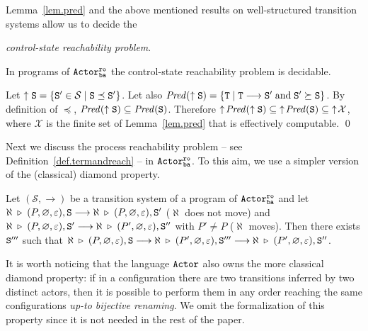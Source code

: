 \documentclass{LMCS}
\newcommand{\cal}{\mathcal}
\theoremstyle{plain}\newtheorem{proposition}[thm]{Proposition}
\theoremstyle{plain}\newtheorem{lemma}[thm]{Lemma}
\theoremstyle{plain}\newtheorem{theorem}[thm]{Theorem}
\theoremstyle{plain}\newtheorem{corollary}[thm]{Corollary}
\newif\ifconf \conffalse
\newif\ifcamera \camerafalse
\newcommand{\State}{{\tt S}}
\newcommand{\StateT}{{\tt T}}
\newcommand{\lred}[1]{\stackrel{#1}{\longrightarrow}}
\newcommand{\pred}[1]{{\it Pred}(#1)}
\newcommand{\actor}{${\tt Actor}$}
\newcommand{\actroba}{${\tt Actor^{\tt ro}_{\tt ba}}$}
\begin{document}
Lemma~\ref{lem.pred} and the above mentioned results
on well-structured transition systems
allow us to decide the 
\ifcamera
 \emph{control-state
reachability problem}:
given two states ${\State}$ and ${\StateT}$ of a well-structured transition system with well-quasi-ordering
$\preceq$, decide
whether there is $\StateT' \succeq \StateT$ such that $\State \lred{}^* \StateT'$.
\else
 \emph{control-state
reachability problem}.
\fi

\begin{thm}
\label{thm.cs-reachability}
\ifcamera
In {\actroba} process reachability is decidable.
\else
In programs of {\actroba}
the control-state reachability problem is decidable.
\fi
\end{thm}

\ifconf
\else
\proof
Let $\uparrow \State =
\{ \State' \in {\cal S} \; | \; \State \preceq \State'\}$. Let also
$\pred{\uparrow \State} = \{ \StateT \; | \; \StateT \lred{} \State'
\; \mbox{and} \; \State' \succeq \State\}$. 
By definition of $\preceq$, $\pred{\uparrow \State} \subseteq 
\pred{\State}$. Therefore 
$\uparrow \! \pred{\uparrow \State} \subseteq \; \uparrow \! \pred{\State} \subseteq
\; \uparrow \! {\cal X}$, where ${\cal X}$ is the finite set of Lemma~\ref{lem.pred}
that is effectively computable. 
\qed
\fi

Next we discuss the process reachability problem -- 
see Definition~\ref{def.termandreach} -- in {\actroba}. To this aim, we use a 
simpler version of the (classical) diamond property.

\begin{prop}
\label{prop:simpleDiamond}
Let $({\cal S},\lred{})$ be a transition system of a program
of {\actroba} and let
$\aleph \; \triangleright \; (P, \varnothing, \varepsilon),\State
\lred{} \aleph \; \triangleright \; (P, \varnothing, \varepsilon),\State'$
($\aleph$ does not move) and 
$\aleph \; \triangleright \; (P, \varnothing, \varepsilon),\State'
\lred{} \aleph \; \triangleright \; (P', \varnothing, \varepsilon),\State''$
with $P' \neq P$ ($\aleph$ moves).
Then there exists $\State'''$ such that
$\aleph \; \triangleright \; (P, \varnothing, \varepsilon),\State
\lred{} \aleph \; \triangleright \; (P', \varnothing, \varepsilon),\State'''
\lred{} \aleph \; \triangleright \; (P', \varnothing, \varepsilon),\State''$.
\end{prop}
It is worth noticing that the language {\actor} also owns the more classical 
diamond property:
if in a configuration there are two transitions inferred by two
distinct actors, then it is possible to perform them in any order
reaching the same configurations \emph{up-to bijective renaming}.
We omit the formalization of this property since it is not needed
in the rest of the paper.
\end{document}
